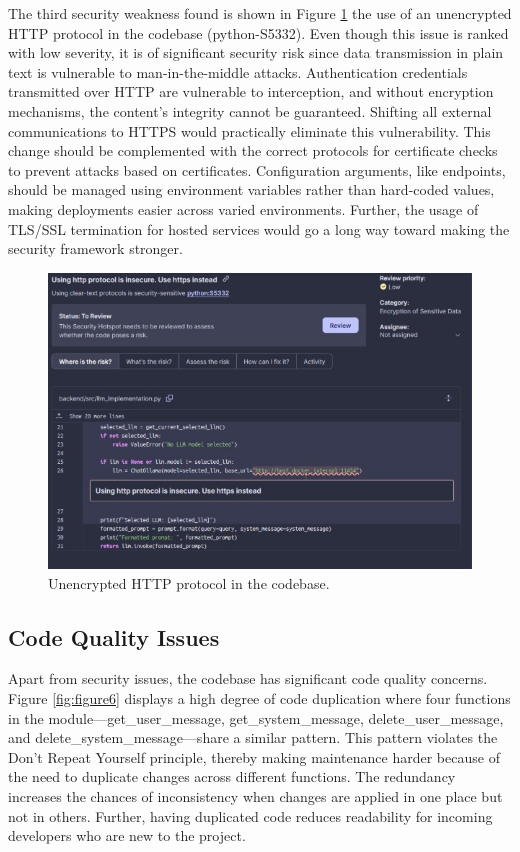 \documentclass[sigconf]{acmart}
\begin{document}
The third security weakness found is shown in Figure \ref{fig:figure5} the use of an unencrypted HTTP protocol in the codebase (python-S5332). Even though this issue is ranked with low severity, it is of significant security risk since data transmission in plain text is vulnerable to man-in-the-middle attacks. Authentication credentials transmitted over HTTP are vulnerable to interception, and without encryption mechanisms, the content's integrity cannot be guaranteed. Shifting all external communications to HTTPS would practically eliminate this vulnerability. This change should be complemented with the correct protocols for certificate checks to prevent attacks based on certificates. Configuration arguments, like endpoints, should be managed using environment variables rather than hard-coded values, making deployments easier across varied environments. Further, the usage of TLS/SSL termination for hosted services would go a long way toward making the security framework stronger.

\begin{figure}[htbp]
    \centering
    \includegraphics[width=1\linewidth]{Image3.jpg}
    \caption{Unencrypted HTTP protocol in the codebase.}
    \label{fig:figure5}
\end{figure}

\subsection{Code Quality Issues}
Apart from security issues, the codebase has significant code quality concerns. Figure \ref{fig:figure6} displays a high degree of code duplication where four functions in the module—get\allowbreak\_user\allowbreak\_message\allowbreak, get\allowbreak\_system\allowbreak\_message\allowbreak, delete\allowbreak\_user\allowbreak\_message\allowbreak, and delete\allowbreak\_system\allowbreak\_message\allowbreak—share a similar pattern. This pattern violates the Don't Repeat Yourself principle, thereby making maintenance harder because of the need to duplicate changes across different functions. The redundancy increases the chances of inconsistency when changes are applied in one place but not in others. Further, having duplicated code reduces readability for incoming developers who are new to the project.
\end{document}
